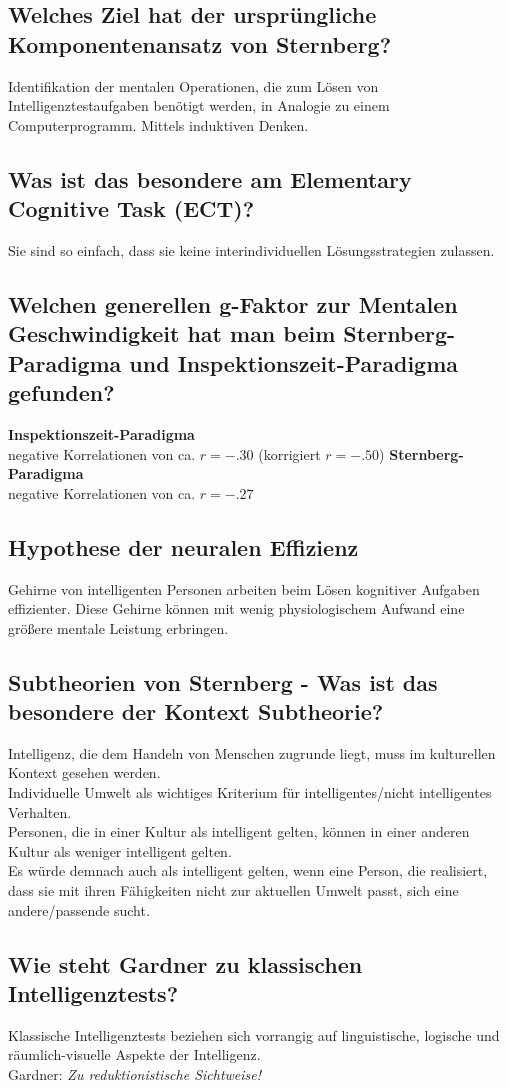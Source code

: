 \documentclass[a6paper,10pt,DIV=40]{scrartcl}
\begin{document}
\subsection{Welches Ziel hat der ursprüngliche Komponentenansatz von Sternberg?}
Identifikation der mentalen Operationen, die zum Lösen von Intelligenztestaufgaben benötigt werden, in Analogie zu einem Computerprogramm. Mittels induktiven Denken.
\subsection{Was ist das besondere am Elementary Cognitive Task (ECT)?}
Sie sind so einfach, dass sie keine interindividuellen Lösungsstrategien zulassen.
\subsection{Welchen generellen g-Faktor zur Mentalen Geschwindigkeit hat man beim Sternberg-Paradigma und Inspektionszeit-Paradigma gefunden?}
    \textbf{Inspektionszeit-Paradigma}\\
    negative Korrelationen von ca. $r = -.30$ (korrigiert $r = -.50$)
    \textbf{Sternberg-Paradigma}\\
    negative Korrelationen von ca. $r = -.27$
\subsection{Hypothese der neuralen Effizienz}
Gehirne von intelligenten Personen arbeiten beim Lösen kognitiver Aufgaben effizienter. Diese Gehirne können mit wenig physiologischem Aufwand eine größere mentale Leistung erbringen.
\subsection{Subtheorien von Sternberg - Was ist das besondere der Kontext Subtheorie?}
Intelligenz, die dem Handeln von Menschen zugrunde liegt, muss im kulturellen Kontext gesehen werden.\\
Individuelle Umwelt als wichtiges Kriterium für intelligentes/nicht intelligentes
Verhalten.\\
Personen, die in einer Kultur als intelligent gelten, können in einer anderen Kultur als weniger intelligent gelten.\\
Es würde demnach auch als intelligent gelten, wenn eine Person, die realisiert,
dass sie mit ihren Fähigkeiten nicht zur aktuellen Umwelt passt, sich eine
andere/passende sucht.
\subsection{Wie steht Gardner zu klassischen Intelligenztests?}
Klassische Intelligenztests beziehen sich vorrangig auf linguistische, logische und
räumlich-visuelle Aspekte der Intelligenz.\\
Gardner: \textit{Zu reduktionistische Sichtweise!}
\end{document}
